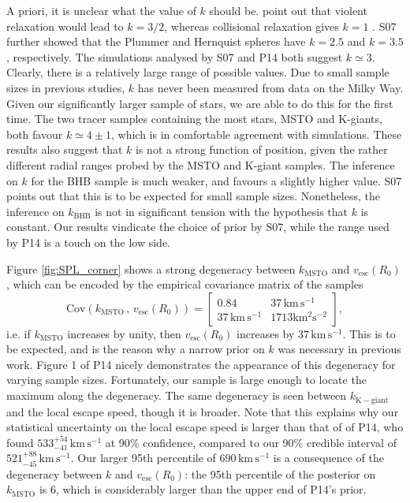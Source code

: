 \documentclass[useAMS,twocolumn,usenatbib]{mn2e}
\def\kms{{\,\mathrm{km\,s^{-1}}}}
\def\vesc{{v_\mathrm{esc}}}
\begin{document}
A priori, it is unclear what the value of $k$ should be. 
\citet{Le90} point out that violent relaxation would lead to $k=3/2$, whereas collisional relaxation gives $k=1$ \citep{Sp72}. 
S07 further showed that the Plummer and Hernquist spheres \citep{BT08} have $k=2.5$ and $k=3.5$, respectively. 
The simulations analysed by S07 and P14 both suggest $k\simeq3$. 
Clearly, there is a relatively large range of possible values.  
Due to small sample sizes in previous studies, $k$ has never been measured from data on the Milky Way. 
Given our significantly larger sample of stars, we are able to do this for the first time. 
The two tracer samples containing the most stars, MSTO and K-giants, both favour $k\simeq4\pm1$, which is in comfortable agreement with simulations.
These results also suggest that $k$ is not a strong function of position, given the rather different radial ranges probed by the MSTO and K-giant samples.
The inference on $k$ for the BHB sample is much weaker, and favours a slightly higher value. 
S07 points out that this is to be expected for small sample sizes. 
Nonetheless, the inference on $k_\mathrm{BHB}$ is not in significant tension with the hypothesis that $k$ is constant. 
Our results vindicate the choice of prior by S07, while the range used by P14 is a touch on the low side.

Figure \ref{fig:SPL_corner} shows a strong degeneracy between $k_\mathrm{MSTO}$ and $\vesc(R_0)$, which can be encoded by the empirical covariance matrix of the samples
%
\begin{equation}
\mathrm{Cov}\left(k_\mathrm{MSTO}\,,\,\vesc(R_0)\right) = \begin{bmatrix} 0.84 & 37\kms \\ 37\kms & 1713 \mathrm{km^2s^{-2}}\end{bmatrix},
\end{equation}
%
i.e. if $k_\mathrm{MSTO}$ increases by unity, then $\vesc(R_0)$ increases by $37\kms$.
This is to be expected, and is the reason why a narrow prior on $k$ was necessary in previous work. 
Figure 1 of P14 nicely demonstrates the appearance of this degeneracy for varying sample sizes. 
Fortunately, our sample is large enough to locate the maximum along the degeneracy. 
The same degeneracy is seen between $k_\mathrm{K-giant}$ and the local escape speed, though it is broader.
Note that this explains why our statistical uncertainty on the local escape speed is larger than that of of P14, who found $533^{+54}_{-41}\kms$ at 90\% confidence, compared to our 90\% credible interval of $521^{+88}_{-45}\kms$.
Our larger 95th percentile of $690\kms$ is a consequence of the degeneracy between $k$ and $\vesc(R_0)$: the 95th percentile of the posterior on $k_\mathrm{MSTO}$ is 6, which is considerably larger than the upper end of P14's prior.
\end{document}
